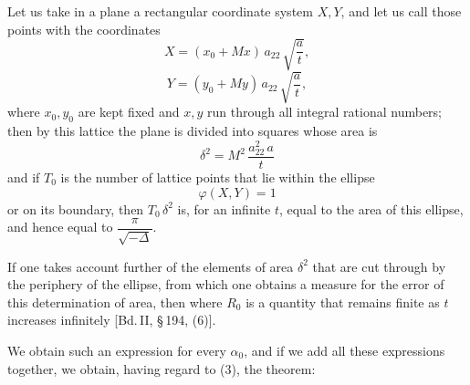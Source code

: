 Let us take in a plane a rectangular coordinate system
 $X, Y$, and let us call  those points
with the coordinates
\[
X = (x_0 + Mx)\, a_{22}\, \sqrt{\dfrac{a}{t}},
\]
\[
Y = (y_0 + My)\, a_{22}\, \sqrt{\dfrac{a}{t}},
\]
where $x_0, y_0$ are kept fixed and $x, y$ run through all integral
rational numbers; then by this lattice the plane is divided into
squares whose area is
\[
\delta^2 = M^2\, \dfrac{a_{22}^2\, a}{t}
\]
and if $T_0$ is the number of lattice points that lie within
the ellipse
\[
\varphi(X, Y) = 1
\]
or on its boundary, then $T_0\,\delta^2$ is, for an infinite $t$,
equal to the area of this ellipse, and hence equal to $\dfrac{\pi}{\sqrt{-\Delta}}$.

If one takes account further of the elements of area $\delta^2$ that are
cut through by the periphery of the ellipse, from which one obtains a
measure for the error of this determination of area, then
where $R_0$ is a quantity that remains finite as $t$ increases
infinitely [Bd.\,II, \S\,194, (6)].

We obtain such an expression for every $\alpha_0$, and if
we add all these expressions together, we obtain, having regard
to (3), the theorem:

